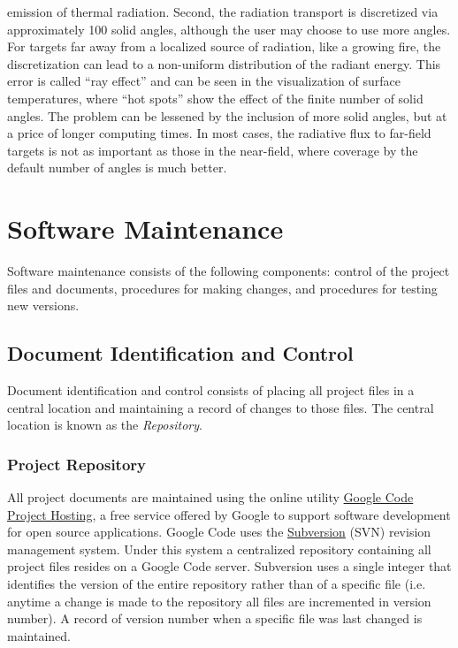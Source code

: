 \documentclass[11pt]{book}
\begin{document}
\begin{description}
emission of thermal radiation.  Second, the radiation transport is discretized via approximately 100 solid angles, although the user may choose to
use more angles. For targets far away from a localized source of radiation, like a growing fire, the discretization can lead to a non-uniform
distribution of the radiant energy. This error is called ``ray effect'' and can be seen in the visualization of surface temperatures, where ``hot
spots'' show the effect of the finite number of solid angles. The problem can be lessened by the inclusion of more solid angles, but at a price of
longer computing times. In most cases, the radiative flux to far-field targets is not as important as those in the near-field, where coverage by the
default number of angles is much better.
\end{description}











\chapter{Software Maintenance}

Software maintenance consists of the following components:
control of the project files and documents, procedures for making changes, and procedures for testing new versions.


\section{Document Identification and Control}

Document identification and control consists of placing all project files in a central location and maintaining a record of changes to those files.
The central location is known as the {\em Repository}.


\subsection{Project Repository}

All project documents are maintained using the online utility \href{http://code.google.com/opensource}{{Google Code Project Hosting}}, a free service
offered by Google to support software development for open source applications.  Google Code uses the \href{http://subversion.tigris.org}{{Subversion}} (SVN) revision management system.
Under this system a centralized repository containing all project files resides on a Google Code server.
Subversion uses a single integer that identifies the version of the entire repository rather than of a specific file
(i.e. anytime a change is made to the repository all files are incremented in version number).  A record of version number when a specific file was last changed is maintained.
\end{document}
